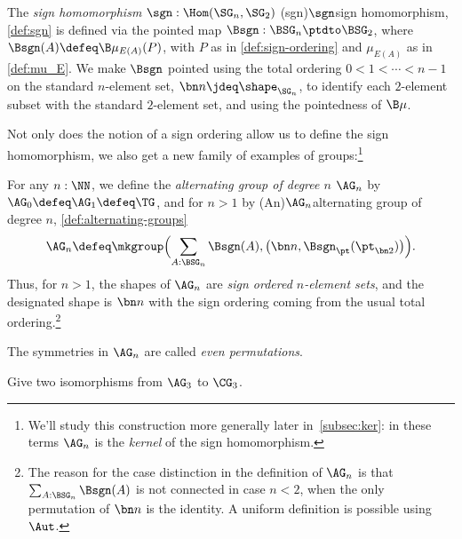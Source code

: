 \begin{definition}\label{def:sgn}
  The \emph{sign homomorphism} $\sgn : \Hom(\SG_n,\SG_2)$%
  \glossary(sgn){$\protect\sgn$}{sign homomorphism, \cref{def:sgn}}
  is defined via the pointed map $\Bsgn : \BSG_n \ptdto \BSG_2$,
  where $\Bsgn(A) \defeq \B\mu_{E(A)}(P)$, with $P$ as in
  \cref{def:sign-ordering} and $\mu_{E(A)}$ as in \cref{def:mu_E}.
  We make $\Bsgn$ pointed using the total ordering 
  $0 < 1 < \cdots < n-1$ on the standard $n$-element set, 
  $\bn n \jdeq \sh_{\SG_n}$, to identify each $2$-element 
  subset with the standard $2$-element set,
  and using the pointedness of $\B\mu$.
\end{definition}
Not only does the notion of a sign ordering allow us to define the
sign homomorphism, we also get a new family of examples of groups:\footnote{%
  We'll study this construction more generally later in~\cref{subsec:ker}:
  in these terms $\AG_n$ is the \emph{kernel} of the sign homomorphism.}
\begin{definition}\label{def:alternating-groups}
  For any $n:\NN$, we define the \emph{alternating group of degree $n$}
  $\AG_n$ by $\AG_0\defeq\AG_1\defeq\TG$, and for $n>1$ by
  \glossary(An){$\protect\AG_n$}{alternating group of degree $n$,
      \cref{def:alternating-groups}}
  \[
  \AG_n \defeq \mkgroup\Bigl(\sum_{A:\BSG_n}\Bsgn(A),
                  \bigl(\bn n, \Bsgn_\pt(\pt_{\bn 2})\bigr)\Bigr).
  \]
  Thus, for $n>1$, the shapes of $\AG_n$ are \emph{sign ordered $n$-element sets},
  and the designated shape is $\bn n$ with the sign ordering coming
  from the usual total ordering.\footnote{The reason for the case distinction
  in the definition of $\AG_n$ is that $\sum_{A:\BSG_n}\Bsgn(A)$ is not
  connected in case $n<2$, when the only permutation of $\bn n$ is the identity.
  A uniform definition is possible using $\Aut$.}

  The symmetries in $\AG_n$ are called \emph{even permutations}.%
\end{definition}

\begin{xca}\label{xca:isos_A3_C3}
  Give two isomorphisms from $\AG_3$ to $\CG_3$.
\end{xca}


